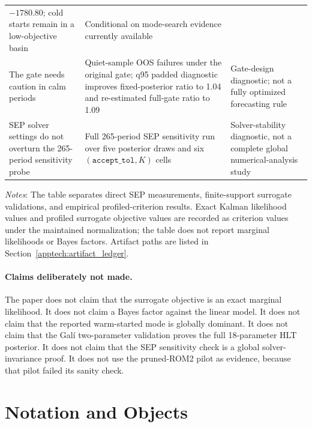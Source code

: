 \documentclass[12pt]{article}
\newcommand{\techappendixnotes}[1]{%
  \par\smallskip
  \noindent\begin{minipage}{0.92\textwidth}%
  \footnotesize #1%
  \end{minipage}\par%
}
\begin{document}
\begin{table}[htbp]
\begin{tabular}{p{}p{}p{}}
\(-1780.80\); cold starts remain in a low-objective basin & Conditional on
mode-search evidence currently available \\
The gate needs caution in calm periods & Quiet-sample OOS failures under the
original gate; q95 padded diagnostic improves fixed-posterior ratio to 1.04 and
re-estimated full-gate ratio to 1.09 & Gate-design diagnostic; not a fully
optimized forecasting rule \\
SEP solver settings do not overturn the 265-period sensitivity probe & Full
265-period SEP sensitivity run over five posterior draws and six
\((\texttt{accept\_tol},K)\) cells & Solver-stability diagnostic, not a
complete global numerical-analysis study \\
\bottomrule
\end{tabular}
\techappendixnotes{\textit{Notes}: The table separates direct SEP
measurements, finite-support surrogate validations, and empirical
profiled-criterion results. Exact Kalman likelihood values and profiled
surrogate objective values are recorded as criterion values under the maintained
normalization; the table does not report marginal likelihoods or Bayes
factors. Artifact paths are listed in Section~\ref{apptech:artifact_ledger}.}
\end{table}

\paragraph{Claims deliberately not made.}
The paper does not claim that the surrogate objective is an exact marginal
likelihood. It does not claim a Bayes factor against the linear model. It does
not claim that the reported warm-started mode is globally dominant. It does not
claim that the Gal\'i two-parameter validation proves the full 18-parameter
HLT posterior. It does not claim that the SEP sensitivity check is a global
solver-invariance proof. It does not use the pruned-ROM2 pilot as evidence,
because that pilot failed its sanity check.

\section{Notation and Objects}
\label{apptech:notation}
\end{document}
